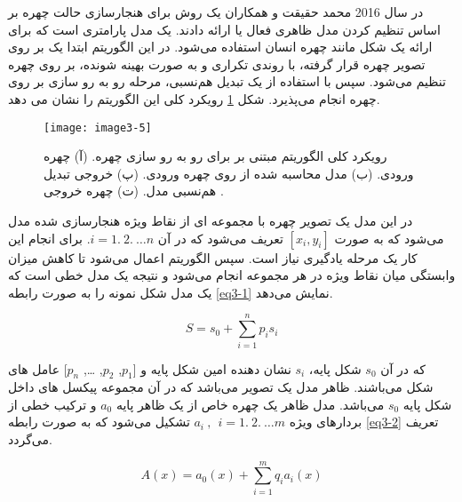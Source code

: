 \noindent
در سال 2016 محمد حقیقت و همکاران \cite{HAGHIGHAT201623} یک روش برای هنجارسازی حالت چهره بر اساس تنظیم کردن مدل ظاهری فعال  یا  ارائه دادند.  یک مدل پارامتری است که برای ارائه یک شکل مانند چهره انسان استفاده می‌شود. در این الگوریتم ابتدا یک  بر روی تصویر چهره قرار گرفته، با روندی تکراری و به صورت بهینه شونده، بر روی چهره تنظیم می‌شود. سپس با استفاده از یک تبدیل هم‌نسبی، مرحله رو به رو سازی بر روی چهره انجام می‌پذیرد. شکل \ref{image3-5} رویکرد کلی این الگوریتم را نشان می دهد. 

\begin{figure}[h]
\centering
  \texttt{[image: image3-5]}
  \caption{
  	رویکرد کلی الگوریتم مبتنی بر  برای رو به رو سازی چهره. (آ) چهره ورودی. (ب) مدل محاسبه شده از روی چهره ورودی. (پ) خروجی تبدیل هم‌نسبی مدل. (ت) چهره خروجی 
  	\cite{HAGHIGHAT201623}.
  }
  \label{image3-5}
\end{figure}

\noindent
در این مدل یک تصویر چهره با مجموعه ای از نقاط ویژه هنجارسازی شده مدل می‌شود که به صورت $[x_i , y_i]$ تعریف می‌شود که در آن $i=1.\ 2.\ \ldots n $. برای انجام این کار یک مرحله یادگیری نیاز است. سپس الگوریتم  اعمال می‌شود تا کاهش میزان وابستگی میان نقاط ویژه در هر مجموعه انجام می‌شود و نتیجه یک مدل خطی است که یک مدل شکل نمونه را به صورت رابطه \ref{eq3-1} نمایش می‌دهد.

\begin{equation}\label{eq3-1}
S=s_0+\sum_{i=1}^{n}{p_is_i}
\end{equation}

\noindent
که در آن $s_0$ شکل پایه، $s_i$ نشان دهنده  امین شکل پایه و [$p_1$, $p_2$, \ldots, $p_n$] عامل های شکل می‌باشند. ظاهر  مدل  یک تصویر  می‌باشد که در آن  مجموعه پیکسل های داخل شکل پایه $s_0$ می‌باشد. مدل ظاهر یک چهره خاص از یک ظاهر پایه $a_0$ و ترکیب خطی از بردارهای ویژه
$a_i\ ,\ \ i=1.\ 2.\ \ldots m$
تشکیل می‌شود که به صورت رابطه \ref{eq3-2} تعریف می‌گردد.

\begin{equation}\label{eq3-2}
A(x)=a_0(x)+\sum_{i=1}^{m}{q_ia_i(x)}
\end{equation}

